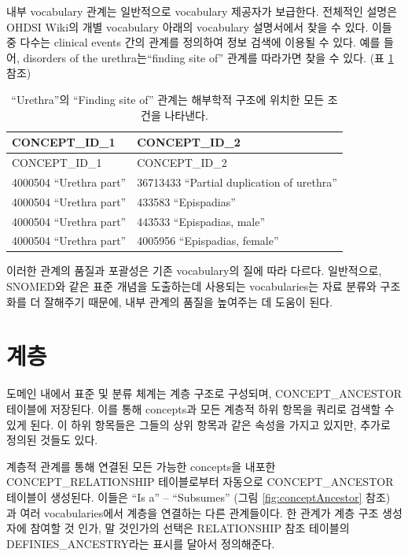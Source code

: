 \documentclass[11pt]{book}
\theoremstyle{definition}
\theoremstyle{definition}
\theoremstyle{definition}
\theoremstyle{remark}
\begin{document}
내부 vocabulary 관계는 일반적으로 vocabulary 제공자가 보급한다. 전체적인
설명은 OHDSI Wiki의 개별 vocabulary 아래의 vocabulary 설명서에서 찾을 수
있다. 이들 중 다수는 clinical events 간의 관계를 정의하여 정보 검색에
이용될 수 있다. 예를 들어, disorders of the urethra는``finding site of''
관계를 따라가면 찾을 수 있다. (표 \ref{tab:findingSite}참조)

\begin{longtable}[]{@{}ll@{}}
\caption{\label{tab:findingSite} ``Urethra''의 ``Finding site of'' 관계는
해부학적 구조에 위치한 모든 조건을 나타낸다.}\tabularnewline
\toprule
CONCEPT\_ID\_1 & CONCEPT\_ID\_2\tabularnewline
\midrule
\endfirsthead
\toprule
CONCEPT\_ID\_1 & CONCEPT\_ID\_2\tabularnewline
\midrule
\endhead
4000504 ``Urethra part'' & 36713433 ``Partial duplication of
urethra''\tabularnewline
4000504 ``Urethra part'' & 433583 ``Epispadias''\tabularnewline
4000504 ``Urethra part'' & 443533 ``Epispadias, male''\tabularnewline
4000504 ``Urethra part'' & 4005956 ``Epispadias, female''\tabularnewline
\bottomrule
\end{longtable}

이러한 관계의 품질과 포괄성은 기존 vocabulary의 질에 따라 다르다.
일반적으로, SNOMED와 같은 표준 개념을 도출하는데 사용되는 vocabularies는
자료 분류와 구조화를 더 잘해주기 때문에, 내부 관계의 품질을 높여주는 데
도움이 된다.

\section{계층}\label{conceptAncestor}

도메인 내에서 표준 및 분류 체계는 계층 구조로 구성되며,
CONCEPT\_ANCESTOR 테이블에 저장된다. 이를 통해 concepts과 모든 계층적
하위 항목을 쿼리로 검색할 수 있게 된다. 이 하위 항목들은 그들의 상위
항목과 같은 속성을 가지고 있지만, 추가로 정의된 것들도 있다.

계층적 관계를 통해 연결된 모든 가능한 concepts을 내포한
CONCEPT\_RELATIONSHIP 테이블로부터 자동으로 CONCEPT\_ANCESTOR 테이블이
생성된다. 이들은 ``Is a'' -- ``Subsumes'' (그림
\ref{fig:conceptAncestor} 참조) 과 여러 vocabularies에서 계층을 연결하는
다른 관계들이다. 한 관계가 계층 구조 생성자에 참여할 것 인가, 말
것인가의 선택은 RELATIONSHIP 참조 테이블의 DEFINIES\_ANCESTRY라는 표시를
달아서 정의해준다.
\end{document}
